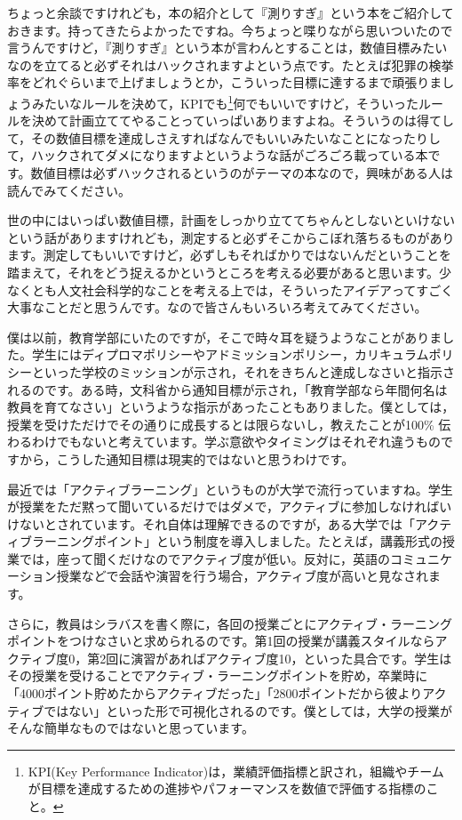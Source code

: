 \documentclass{ltjsbook}
\begin{document}
ちょっと余談ですけれども，本の紹介として『測りすぎ』という本\parencite{Jerry2019}をご紹介しておきます。持ってきたらよかったですね。今ちょっと喋りながら思いついたので言うんですけど，『測りすぎ』という本が言わんとすることは，数値目標みたいなのを立てると必ずそれはハックされますよという点です。たとえば犯罪の検挙率をどれぐらいまで上げましょうとか，こういった目標に達するまで頑張りましょうみたいなルールを決めて，KPIでも\footnote{KPI(Key Performance Indicator)は，業績評価指標と訳され，組織やチームが目標を達成するための進捗やパフォーマンスを数値で評価する指標のこと。}何でもいいですけど，そういったルールを決めて計画立ててやることっていっぱいありますよね。そういうのは得てして，その数値目標を達成しさえすればなんでもいいみたいなことになったりして，ハックされてダメになりますよというような話がごろごろ載っている本です。数値目標は必ずハックされるというのがテーマの本なので，興味がある人は読んでみてください。

世の中にはいっぱい数値目標，計画をしっかり立ててちゃんとしないといけないという話がありますけれども，測定すると必ずそこからこぼれ落ちるものがあります。測定してもいいですけど，必ずしもそればかりではないんだということを踏まえて，それをどう捉えるかというところを考える必要があると思います。少なくとも人文社会科学的なことを考える上では，そういったアイデアってすごく大事なことだと思うんです。なので皆さんもいろいろ考えてみてください。

僕は以前，教育学部にいたのですが，そこで時々耳を疑うようなことがありました。学生にはディプロマポリシーやアドミッションポリシー，カリキュラムポリシーといった学校のミッションが示され，それをきちんと達成しなさいと指示されるのです。ある時，文科省から通知目標が示され，「教育学部なら年間何名は教員を育てなさい」というような指示があったこともありました。僕としては，授業を受けただけでその通りに成長するとは限らないし，教えたことが100\% 伝わるわけでもないと考えています。学ぶ意欲やタイミングはそれぞれ違うものですから，こうした通知目標は現実的ではないと思うわけです。

最近では「アクティブラーニング」というものが大学で流行っていますね。学生が授業をただ黙って聞いているだけではダメで，アクティブに参加しなければいけないとされています。それ自体は理解できるのですが，ある大学では「アクティブラーニングポイント」という制度を導入しました。たとえば，講義形式の授業では，座って聞くだけなのでアクティブ度が低い。反対に，英語のコミュニケーション授業などで会話や演習を行う場合，アクティブ度が高いと見なされます。

さらに，教員はシラバスを書く際に，各回の授業ごとにアクティブ・ラーニングポイントをつけなさいと求められるのです。第1回の授業が講義スタイルならアクティブ度0，第2回に演習があればアクティブ度10，といった具合です。学生はその授業を受けることでアクティブ・ラーニングポイントを貯め，卒業時に「4000ポイント貯めたからアクティブだった」「2800ポイントだから彼よりアクティブではない」といった形で可視化されるのです。僕としては，大学の授業がそんな簡単なものではないと思っています。
\end{document}
